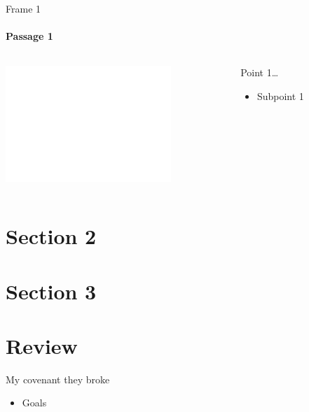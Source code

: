 \begin{frame}{Frame 1}
\framesubtitle{Passage 1}

\begin{columns}[c]
\begin{column}{0.6\textwidth}
	\includegraphics[draft, width=\columnwidth]{figures/dummy.png}
\end{column}
\begin{column}{0.4\textwidth}
	Point 1\ldots
	\begin{itemize}
		\item Subpoint 1
	\end{itemize}
\end{column}
\end{columns}

\end{frame}

\section{Section 2}

\section{Section 3}

\section{Review}

\begin{frame}{My covenant they broke}
	\begin{itemize}
		\item Goals
	\end{itemize}
	
\end{frame}

